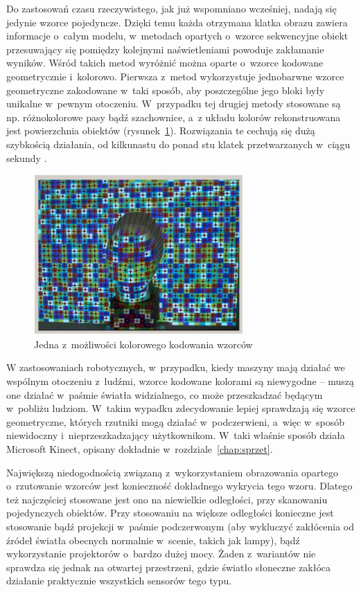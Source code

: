 Do zastosowań czasu rzeczywistego, jak już wspomniano wcześniej, nadają się
jedynie wzorce pojedyncze. Dzięki temu każda otrzymana klatka obrazu zawiera
informacje o~całym modelu, w~metodach opartych o~wzorce sekwencyjne obiekt
przesuwający się pomiędzy kolejnymi naświetleniami powoduje zakłamanie wyników.
Wśród takich metod wyróżnić można oparte o~wzorce kodowane geometrycznie 
i~kolorowo. Pierwsza z~metod wykorzystuje jednobarwne wzorce geometryczne
zakodowane w~taki sposób, aby poszczególne jego bloki były unikalne w~pewnym
otoczeniu. W~przypadku tej drugiej metody stosowane są np. różnokolorowe pasy
bądź szachownice, a~z układu kolorów rekonstruowana jest powierzchnia obiektów (rysunek~\ref{fig:struct_color}).
Rozwiązania te cechują się dużą szybkością działania, od kilkunastu do ponad
stu klatek przetwarzanych w~ciągu sekundy \cite{4429304}.

\begin{figure}[h!]
\centering
\includegraphics[width=8cm]{../../Common/img/struct_color}
\caption[Wzorzec kodowany kolorem]
{Jedna z~możliwości kolorowego kodowania wzorców \cite{4429304}}
\label{fig:struct_color}
\end{figure}

W zastosowaniach robotycznych, w~przypadku, kiedy maszyny mają działać we
wspólnym otoczeniu z~ludźmi, wzorce kodowane kolorami są niewygodne -- muszą one
działać w~paśmie światła widzialnego, co może przeszkadzać będącym w~pobliżu
ludziom. W~takim wypadku zdecydowanie lepiej sprawdzają się wzorce
geometryczne, których rzutniki mogą działać w~podczerwieni, a~więc w~sposób
niewidoczny i~nieprzeszkadzający użytkownikom. W~taki właśnie sposób działa
Microsoft Kinect, opisany dokładnie w~rozdziale~\ref{chap:sprzet}.

Największą niedogodnością związaną z~wykorzystaniem obrazowania opartego 
o~rzutowanie wzorców jest konieczność dokładnego wykrycia tego wzoru. Dlatego też
najczęściej stosowane jest ono na niewielkie odległości, przy skanowaniu
pojedynczych obiektów. Przy stosowaniu na większe odległości konieczne jest
stosowanie bądź projekcji w~paśmie podczerwonym (aby wykluczyć zakłócenia od
źródeł światła obecnych normalnie w~scenie, takich jak lampy), bądź wykorzystanie projektorów o~bardzo dużej
mocy. Żaden z~wariantów nie sprawdza się jednak na otwartej przestrzeni, gdzie
światło słoneczne zakłóca działanie praktycznie wszystkich sensorów tego typu.

